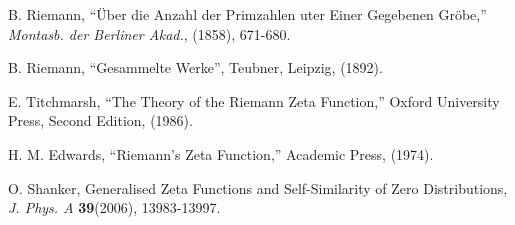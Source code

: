 \documentclass[12pt]{article}
\begin{document}
 
\begin{thebibliography}{10} 

 B. Riemann, ``\"{U}ber die Anzahl der Primzahlen uter
Einer Gegebenen Gr\"{o}be,'' {\it Montasb. der Berliner Akad.}, (1858),
671-680.

 B. Riemann, ``Gesammelte Werke'', Teubner, Leipzig, (1892).

 E. Titchmarsh, ``The Theory of the Riemann Zeta
Function,'' Oxford University Press, Second Edition, (1986).

 H. M. Edwards, ``Riemann's Zeta Function,'' 
Academic Press,  (1974).

 O. Shanker, 
Generalised Zeta Functions and Self-Similarity of Zero Distributions,
{\it J.  Phys. A} {\bf39}(2006), 13983-13997.


\end{thebibliography} 
\end{document}
